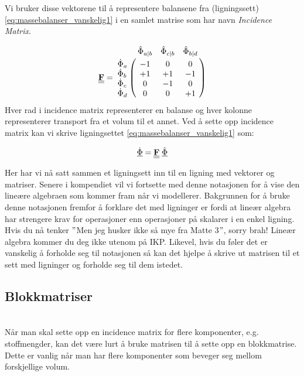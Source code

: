 Vi bruker disse vektorene til å representere balansene fra (ligningssett) \ref{eq:massebalanser_vanskelig1} i en samlet matrise som har navn \textit{Incidence Matrix}.

\begin{equation}
    \textbf{\doubleunderline{F}} = 
    \bordermatrix{~ & \hat{\Phi}_{a|b} & \hat{\Phi}_{c|b}  & \hat{\Phi}_{b|d} \cr
                  \dot{\Phi}_a & -1 & 0 & 0 \cr
                  \dot{\Phi}_b & +1 & +1 & -1\cr
                  \dot{\Phi}_c & 0 & -1 & 0\cr
                  \dot{\Phi}_d & 0 & 0 & +1
                  }
\end{equation}
Hver rad i incidence matrix representerer en balanse og hver kolonne representerer transport fra et volum til et annet. Ved å sette opp incidence matrix kan vi skrive ligningsettet \ref{eq:massebalanser_vanskelig1} som:

\begin{equation}
   \underline{\dot{\Phi}} = \textbf{\underline{\underline{F}}}\hspace{0.1cm}\underline{\hat{\Phi}}
\end{equation}

Her har vi nå satt sammen et ligningsett inn til en ligning med vektorer og matriser. Senere i kompendiet vil vi fortsette med denne notasjonen for å vise den lineære algebraen som kommer fram når vi modellerer. Bakgrunnen for å bruke denne notasjonen fremfor å forklare det med ligninger er fordi at lineær algebra har strengere krav for operasjoner enn operasjoner på skalarer i en enkel ligning. Hvis du nå tenker $"$Men jeg husker ikke så mye fra Matte 3$"$, sorry brah! Lineær algebra kommer du deg ikke utenom på IKP. Likevel, hvis du føler det er vanskelig å forholde seg til notasjonen så kan det hjelpe å skrive ut matrisen til et sett med ligninger og forholde seg til dem istedet. 

\clearpage
\subsection{Blokkmatriser}\\
Når man skal sette opp en incidence matrix for flere komponenter, e.g. stoffmengder, kan det være lurt å bruke matrisen til å sette opp en blokkmatrise. Dette er vanlig når man har flere komponenter som beveger seg mellom forskjellige volum. 

